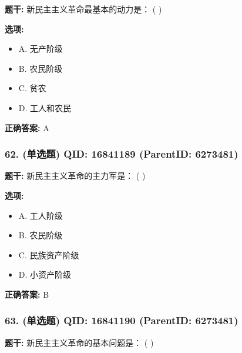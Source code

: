 \documentclass[12pt,UTF8]{ctexart}
\begin{document}
\textbf{题干:}
新民主主义革命最基本的动力是： ( )



\textbf{选项:}
\begin{itemize}[leftmargin=*]

  \item A. 无产阶级

  \item B. 农民阶级

  \item C. 贫农

  \item D. 工人和农民

\end{itemize}

\textbf{正确答案:}
A

\vspace{0.3em}\hrulefill\vspace{0.7em}

\subsubsection*{62. (单选题) \small QID: 16841189 (ParentID: 6273481)}

\textbf{题干:}
新民主主义革命的主力军是： ( )



\textbf{选项:}
\begin{itemize}[leftmargin=*]

  \item A. 工人阶级

  \item B. 农民阶级

  \item C. 民族资产阶级

  \item D. 小资产阶级

\end{itemize}

\textbf{正确答案:}
B

\vspace{0.3em}\hrulefill\vspace{0.7em}

\subsubsection*{63. (单选题) \small QID: 16841190 (ParentID: 6273481)}

\textbf{题干:}
新民主主义革命的基本问题是： ( )
\end{document}
